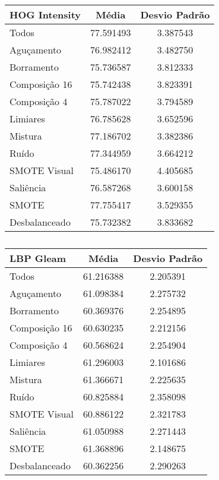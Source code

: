 \begin{table}[!htbp]
\centering
\caption{}
\label{tab:resultados:x:melhor}
\begin{tabular}{|l|c|c|}
\hline
\textbf{HOG Intensity} & \textbf{Média}     & \textbf{Desvio Padrão} \\ \hline
   Todos        &  77.591493 &  3.387543  \\ \hline
  Aguçamento    &  76.982412 &  3.482750  \\ \hline
  Borramento    &  75.736587 &  3.812333  \\ \hline
  Composição 16 &  75.742438 &  3.823391  \\ \hline
  Composição 4  &  75.787022 &  3.794589  \\ \hline
  Limiares      &  76.785628 &  3.652596  \\ \hline
  Mistura       &  77.186702 &  3.382386  \\ \hline
  Ruído         &  77.344959 &  3.664212  \\ \hline
  SMOTE Visual  &  75.486170 &  4.405685  \\ \hline
  Saliência     &  76.587268 &  3.600158  \\ \hline
 SMOTE          &  77.755417 &  3.529355  \\ \hline
Desbalanceado   &  75.732382 &  3.833682  \\ \hline
\end{tabular}
\end{table}

\begin{table}[!htbp]
\centering
\caption{}
\label{tab:resultados:x:melhor}
\begin{tabular}{|l|c|c|}
\hline
\textbf{LBP Gleam} & \textbf{Média}     & \textbf{Desvio Padrão} \\ \hline
   Todos        &  61.216388 &  2.205391  \\ \hline
  Aguçamento    &  61.098384 &  2.275732  \\ \hline
  Borramento    &  60.369376 &  2.254895  \\ \hline
  Composição 16 &  60.630235 &  2.212156  \\ \hline
  Composição 4  &  60.568624 &  2.254904  \\ \hline
  Limiares      &  61.296003 &  2.101686  \\ \hline
  Mistura       &  61.366671 &  2.225635  \\ \hline
  Ruído         &  60.825884 &  2.358098  \\ \hline
  SMOTE Visual  &  60.886122 &  2.321783  \\ \hline
  Saliência     &  61.050988 &  2.271443  \\ \hline
 SMOTE          &  61.368896 &  2.148675  \\ \hline
Desbalanceado   &  60.362256 &  2.290263  \\ \hline
\end{tabular}
\end{table}

